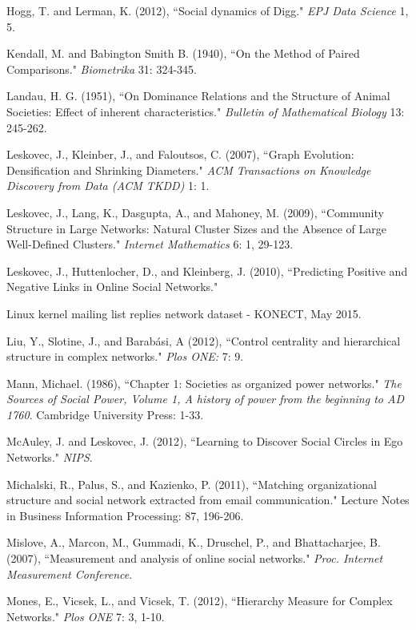 \documentclass[3p,times]{elsarticle}
\begin{document}
\begin{thebibliography}{9}
	Hogg, T. and Lerman, K. (2012),
	``Social dynamics of Digg."
	\textit{EPJ Data Science} 1, 5.
	
	Kendall, M. and Babington Smith B. (1940),
	``On the Method of Paired Comparisons." 
	\textit{Biometrika} 31: 324-345.
	
	Landau, H. G. (1951),
	``On Dominance Relations and the Structure of Animal Societies:  Effect of inherent characteristics." 
	\textit{Bulletin of Mathematical Biology} 13: 245-262.

	Leskovec, J., Kleinber, J., and Faloutsos, C. (2007),
	``Graph Evolution: Densification and Shrinking Diameters."
	\textit{ACM Transactions on Knowledge Discovery from Data (ACM TKDD)} 1: 1.

	Leskovec, J., Lang, K., Dasgupta, A., and Mahoney, M. (2009),
	``Community Structure in Large Networks: Natural Cluster Sizes and the Absence of Large Well-Defined Clusters."
	\textit{Internet Mathematics} 6: 1, 29-123.

	Leskovec, J., Huttenlocher, D., and Kleinberg, J. (2010),
	``Predicting Positive and Negative Links in Online Social Networks."
	
	Linux kernel mailing list replies network dataset - KONECT, May 2015.

	Liu, Y., Slotine, J., and Barab{\'a}si, A (2012),
	``Control centrality and hierarchical structure in complex networks."
	\textit{Plos ONE:} 7: 9.
	
	Mann, Michael. (1986), ``Chapter 1: Societies as organized power networks."
	\textit{The Sources of Social Power, Volume 1, A history of power from the beginning to AD 1760}. Cambridge University Press: 1-33.
	
	McAuley, J. and Leskovec, J. (2012),
	``Learning to Discover Social Circles in Ego Networks."	\textit{NIPS}.
	
	Michalski, R., Palus, S., and Kazienko, P. (2011),
	``Matching organizational structure and social network extracted from email communication."
	Lecture Notes in Business Information Processing: 87, 196-206.
	
	Mislove, A., Marcon, M., Gummadi, K., Druschel, P., and Bhattacharjee, B. (2007),
	``Measurement and analysis of online social networks."
	\textit{Proc. Internet Measurement Conference}.
	
	Mones, E., Vicsek, L., and Vicsek, T. (2012),
	``Hierarchy Measure for Complex Networks." 
	\textit{Plos ONE} 7: 3, 1-10.	
	

\end{thebibliography}
\end{document}
